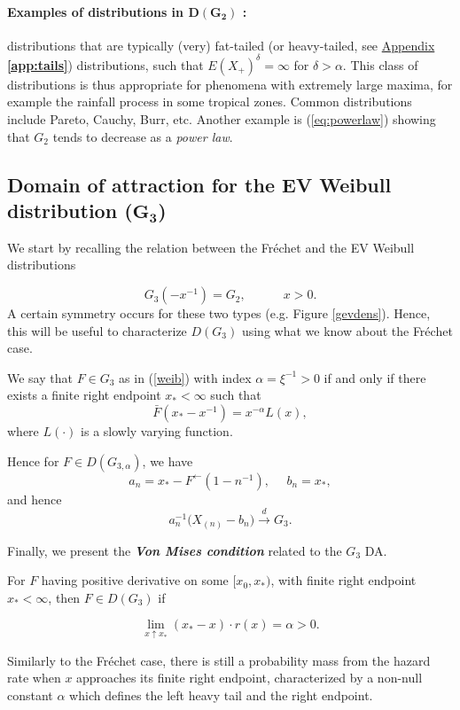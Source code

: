 \paragraph*{Examples of distributions in $\boldsymbol{D(G_{2})}$ :} distributions that are typically (very) fat-tailed (or heavy-tailed, see  \hyperref[app:tails]{Appendix \textbf{\ref{app:tails}}}) distributions, such that $E(X_+)^{\delta}=\infty$ for $\delta>\alpha$. This class of distributions is thus appropriate for phenomena with extremely large maxima, for example the rainfall process in some tropical zones. Common distributions include Pareto, Cauchy, Burr, etc.
Another example is (\ref{eq:powerlaw})
showing that $G_{2}$ tends to decrease as a \emph{power law}.


\subsection*{Domain of attraction for the EV Weibull distribution ($\mathbf{G_{3}}$) }

We start by recalling the relation between the Fréchet and the EV Weibull distributions 

\begin{equation*}
G_3(-x^{-1})=G_2, \qquad\quad x>0.
\end{equation*}
A certain symmetry occurs for these two types (e.g. Figure \ref{gevdens}). Hence, this will be useful to characterize $D(G_3)$ using what we know about the Fréchet case.

\begin{theorem}
We say that $F\in G_{3}$ as in (\ref{weib}) with index $\alpha=\xi^{-1}>0$ if and only if there exists a finite right endpoint $x_*<\infty$ such that 
\begin{equation}
\bar{F}(x_*-x^{-1})=x^{-\alpha}L(x),
\end{equation}
where $L(\cdot)$ is a slowly varying function.
\end{theorem}
Hence for $F\in D(G_{3,\alpha})$, we have 
\begin{equation*}
a_n=x_*-F^{\leftarrow}(1-n^{-1}), \ \  \ \ \ \ b_n=x_*,
\end{equation*}
and hence
\begin{equation*}
a^{-1}_n\Big(X_{(n)}-b_n\Big)\stackrel{d}{\rightarrow}G_{3}.
\end{equation*}

Finally, we present the \emph{\textbf{Von Mises condition}} related to the $G_{3}$ DA. 

\begin{theorem} For $F$ having positive derivative on some $[x_0,x_*)$, with finite right endpoint $x_*<\infty$, then $F\in D(G_{3})$ if

\begin{equation}
\displaystyle{\lim_{ x  \uparrow  x_*}}(x_*-x)\cdot r(x)=\alpha >0.%
\end{equation}
\end{theorem}
Similarly to the Fréchet case, there is still a probability mass from the hazard rate when $x$ approaches its finite right endpoint, characterized by a non-null constant $\alpha$ which defines the left heavy tail and the right endpoint.

